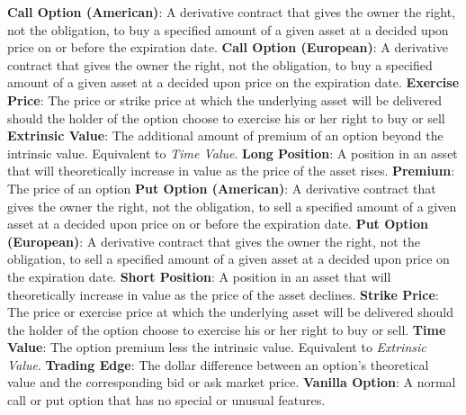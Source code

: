\documentclass[12pt, a4paper, notitlepage]{article}
\numberwithin{equation}{subsection}
\numberwithin{figure}{subsection}
\numberwithin{table}{subsection}
\begin{document}
\textbf{Call Option (American)}: A derivative contract that gives the owner the right, not the obligation, to buy a specified amount of a given asset at a decided upon price on or before the expiration date.
\newline \newline
\textbf{Call Option (European)}: A derivative contract that gives the owner the right, not the obligation, to buy a specified amount of a given asset at a decided upon price on the expiration date.
\newline \newline
\textbf{Exercise Price}: The price or strike price at which the underlying asset will be delivered should the holder of the option choose to exercise his or her right to buy or sell
\newline \newline
\textbf{Extrinsic Value}: The additional amount of premium of an option beyond the intrinsic value. Equivalent to \textit{Time Value}.
\newline \newline
\textbf{Long Position}: A position in an asset that will theoretically increase in value as the price of the asset rises.
\newline \newline
\textbf{Premium}: The price of an option
\newline \newline
\textbf{Put Option (American)}: A derivative contract that gives the owner the right, not the obligation, to sell a specified amount of a given asset at a decided upon price on or before the expiration date.
\newline \newline
\textbf{Put Option (European)}: A derivative contract that gives the owner the right, not the obligation, to sell a specified amount of a given asset at a decided upon price on the expiration date.
\newline \newline
\textbf{Short Position}: A position in an asset that will theoretically increase in value as the price of the asset declines.
\newline \newline
\textbf{Strike Price}: The price or exercise price at which the underlying asset will be delivered should the holder of the option choose to exercise his or her right to buy or sell.
\newline \newline
\textbf{Time Value}: The option premium less the intrinsic value.  Equivalent to \textit{Extrinsic Value}.
\newline \nolinebreak
\textbf{Trading Edge}: The dollar difference between an option's theoretical value and the corresponding bid or ask market price.
\newline \nolinebreak
\textbf{Vanilla Option}: A normal call or put option that has no special or unusual features.
\end{document}
